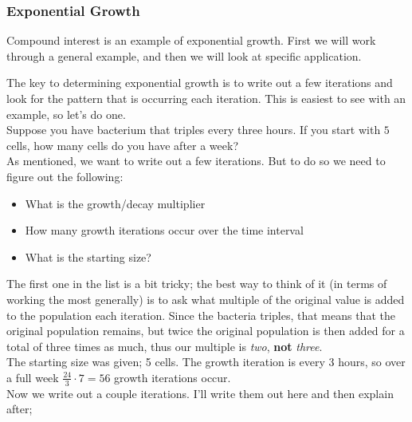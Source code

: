 \documentclass{ximeraXloud}
\begin{document}
    \subsubsection*{Exponential Growth}
    
        Compound interest is an example of exponential growth. First we will work through a general example, and then we will look at specific application. 
        
        \begin{explanation}%
        
            The key to determining exponential growth is to write out a few iterations and look for the pattern that is occurring each iteration. This is easiest to see with an example, so let's do one. \\
            Suppose you have bacterium that triples every three hours. If you start with $5$ cells, how many cells do you have after a week?\\
            As mentioned, we want to write out a few iterations. But to do so we need to figure out the following:
            \begin{itemize}
                \item What is the growth/decay multiplier
                \item How many growth iterations occur over the time interval
                \item What is the starting size?
            \end{itemize}
            The first one in the list is a bit tricky; the best way to think of it (in terms of working the most generally) is to ask what multiple of the original value is added to the population each iteration. Since the bacteria triples, that means that the original population remains, but twice the original population is then added for a total of three times as much, thus our multiple is \textit{two}, \textbf{not} \textit{three}.\\
            The starting size was given; 5 cells. The growth iteration is every 3 hours, so over a full week $\frac{24}{3}\cdot 7 = 56$ growth iterations occur.\\
            
            Now we write out a couple iterations. I'll write them out here and then explain after;
            

\end{explanation}
\end{document}
